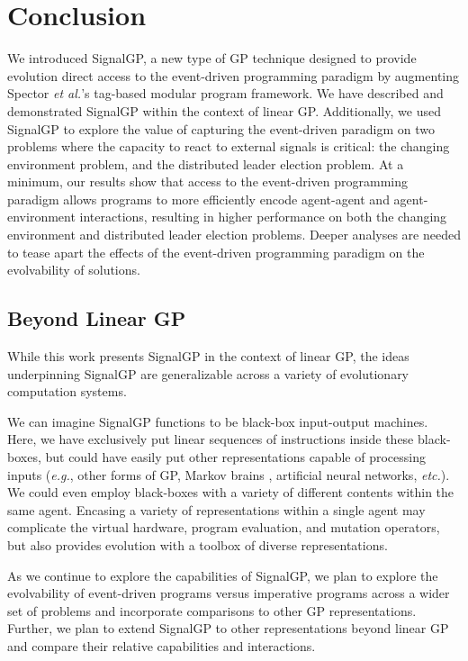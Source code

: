 \section{Conclusion}

We introduced SignalGP, a new type of GP technique designed to provide evolution direct access to the event-driven programming paradigm by augmenting Spector \textit{et al.}'s \citep{spector_tag-based_2011} tag-based modular program framework. 
We have described and demonstrated SignalGP within the context of linear GP. 
Additionally, we used SignalGP to explore the value of capturing the event-driven paradigm on two problems where the capacity to react to external signals is critical: the changing environment problem, and the distributed leader election problem. 
At a minimum, our results show that access to the event-driven programming paradigm allows programs to more efficiently encode agent-agent and agent-environment interactions, resulting in higher performance on both the changing environment and distributed leader election problems. 
Deeper analyses are needed to tease apart the effects of the event-driven programming paradigm on the evolvability of solutions. 

\subsection{Beyond Linear GP}

While this work presents SignalGP in the context of linear GP, the ideas underpinning SignalGP are generalizable across a variety of evolutionary computation systems. 

We can imagine SignalGP functions to be black-box input-output machines. 
Here, we have exclusively put linear sequences of instructions inside these black-boxes, but could have easily put other representations capable of processing inputs (\textit{e.g.}, other forms of GP, Markov brains \citep{hintze_markov_2017}, artificial neural networks, \textit{etc.}).
We could even employ black-boxes with a variety of different contents within the same agent. 
Encasing a variety of representations within a single agent may complicate the virtual hardware, program evaluation, and mutation operators, but also provides evolution with a toolbox of diverse representations.

As we continue to explore the capabilities of SignalGP, we plan to explore the evolvability of event-driven programs versus imperative programs across a wider set of problems and incorporate comparisons to other GP representations. 
Further, we plan to extend SignalGP to other representations beyond linear GP and compare their relative capabilities and interactions.